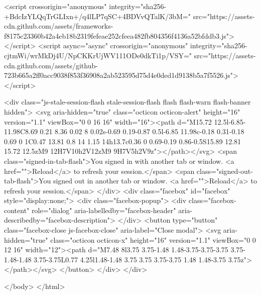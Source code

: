       
      <script crossorigin="anonymous" integrity="sha256-+BdcIzYLQqTrGLIxn+/q4lLP7qSC+4BDVvQTalK/3bM=" src="https://assets-cdn.github.com/assets/frameworks-f8175c23360b42a4eb18b2319fefeae252cfeea482fb804356f4136a52bfddb3.js"></script>
      <script async="async" crossorigin="anonymous" integrity="sha256-cjtmWi/wrMkDj4U/NpCKKrUjWV111ODe0dkTi1p/VSY=" src="https://assets-cdn.github.com/assets/github-723b665a2ff0acc9038f853f36908a2ab523595d75d4e0ded1d9138b5a7f5526.js"></script>
      
      
      
      
      
      
    <div class="js-stale-session-flash stale-session-flash flash flash-warn flash-banner hidden">
      <svg aria-hidden="true" class="octicon octicon-alert" height="16" version="1.1" viewBox="0 0 16 16" width="16"><path d="M15.72 12.5l-6.85-11.98C8.69 0.21 8.36 0.02 8 0.02s-0.69 0.19-0.87 0.5l-6.85 11.98c-0.18 0.31-0.18 0.69 0 1C0.47 13.81 0.8 14 1.15 14h13.7c0.36 0 0.69-0.19 0.86-0.5S15.89 12.81 15.72 12.5zM9 12H7V10h2V12zM9 9H7V5h2V9z"></path></svg>
      <span class="signed-in-tab-flash">You signed in with another tab or window. <a href="">Reload</a> to refresh your session.</span>
      <span class="signed-out-tab-flash">You signed out in another tab or window. <a href="">Reload</a> to refresh your session.</span>
    </div>
    <div class="facebox" id="facebox" style="display:none;">
  <div class="facebox-popup">
    <div class="facebox-content" role="dialog" aria-labelledby="facebox-header" aria-describedby="facebox-description">
    </div>
    <button type="button" class="facebox-close js-facebox-close" aria-label="Close modal">
      <svg aria-hidden="true" class="octicon octicon-x" height="16" version="1.1" viewBox="0 0 12 16" width="12"><path d="M7.48 8l3.75 3.75-1.48 1.48-3.75-3.75-3.75 3.75-1.48-1.48 3.75-3.75L0.77 4.25l1.48-1.48 3.75 3.75 3.75-3.75 1.48 1.48-3.75 3.75z"></path></svg>
    </button>
  </div>
</div>

  </body>
</html>

